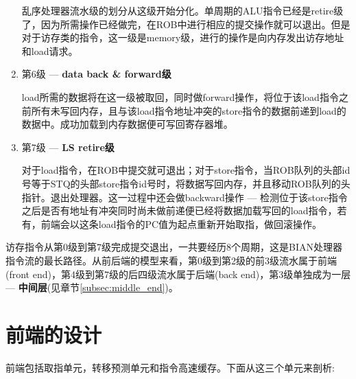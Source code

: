 \begin{enumerate}[label=(\alph*)]
	乱序处理器流水级的划分从这级开始分化。单周期的ALU指令已经是retire级了，因为所需操作已经做完，在ROB中进行相应的提交操作就可以退出。但是对于访存类的指令，这一级是memory级，进行的操作是向内存发出访存地址和load请求。
	\item 第6级 --- \textbf{data back \& forward级}
	
	load所需的数据将在这一级被取回，同时做forward操作，将位于该load指令之前所有未写回内存，且与该load指令地址冲突的store指令的数据前递到load的数据中。成功加载到内存数据便可写回寄存器堆。
	\item 第7级 --- \textbf{LS retire级}
	
	对于load指令，在ROB中提交就可退出；对于store指令，当ROB队列的头部id号等于STQ的头部store指令id号时，将数据写回内存，并且移动ROB队列的头指针。退出处理器。这一过程中还会做backward操作 --- 检测位于该store指令之后是否有地址有冲突同时尚未做前递便已经将数据加载写回的load指令，若有，前端会以这条load指令的PC值为起点重新开始取指，做回滚操作。
\end{enumerate}

	访存指令从第0级到第7级完成提交退出，一共要经历8个周期，这是BIAN处理器指令流的最长路径。从前后端的模型来看，第0级到第2级的前3级流水属于前端(front end)，第4级到第7级的后四级流水属于后端(back end)，第3级单独成为一层 --- \textbf{中间层}(见章节\ref{subsec:middle_end})。
	
\section{前端的设计}\label{sec:frontend}
前端包括取指单元，转移预测单元和指令高速缓存。下面从这三个单元来剖析:
